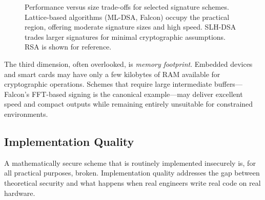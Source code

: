 \begin{figure}[t]
\centering
{}
\caption{Performance versus size trade-offs for selected signature schemes.  Lattice-based algorithms (ML-DSA, Falcon) occupy the practical region, offering moderate signature sizes and high speed.  SLH-DSA trades larger signatures for minimal cryptographic assumptions.  RSA is shown for reference.}
\label{fig:ch05-perf-size}
\end{figure}  The third dimension, often overlooked, is \emph{memory footprint}.  Embedded devices and smart cards may have only a few kilobytes of RAM available for cryptographic operations.  Schemes that require large intermediate buffers---Falcon's FFT-based signing is the canonical example---may deliver excellent speed and compact outputs while remaining entirely unsuitable for constrained environments.

\subsection{Implementation Quality}
\label{subsec:eval-implementation}

A mathematically secure scheme that is routinely implemented insecurely is, for all practical purposes, broken.  Implementation quality addresses the gap between theoretical security and what happens when real engineers write real code on real hardware.

